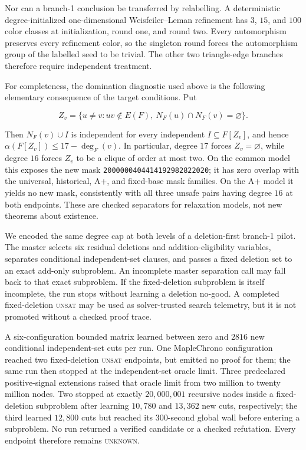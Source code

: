 Nor can a branch-1 conclusion be transferred by relabelling.  A deterministic
degree-initialized one-dimensional Weisfeiler--Leman refinement has \(3\),
\(15\), and \(100\) color classes at initialization, round one, and round two.
Every automorphism preserves every refinement color, so the singleton round
forces the automorphism group of the labelled seed to be trivial.  The other
two triangle-edge branches therefore require independent treatment.

For completeness, the domination diagnostic used above is the following
elementary consequence of the target conditions.  Put

\[
 Z_v=\{u\ne v:uv\notin E(F),\ N_F(u)\cap N_F(v)=\varnothing\}.
\]

Then \(N_F(v)\cup I\) is independent for every independent
\(I\subseteq F[Z_v]\), and hence
\(\alpha(F[Z_v])\le17-\deg_F(v)\).  In particular, degree \(17\) forces
\(Z_v=\varnothing\), while degree \(16\) forces \(Z_v\) to be a clique of
order at most two.  On the common model this exposes the new mask
\texttt{2000000404414192982822020}; it has zero overlap with the universal,
historical, A+, and fixed-base mask families.  On the A+ model it yields no
new mask, consistently with all three unsafe pairs having degree \(16\) at
both endpoints.  These are checked separators for relaxation models, not
new theorems about existence.

We encoded the same degree cap at both levels of a deletion-first branch-1
pilot.  The master selects six residual deletions and addition-eligibility
variables, separates conditional independent-set clauses, and passes a fixed
deletion set to an exact add-only subproblem.  An incomplete master separation
call may fall back to that exact subproblem.  If the fixed-deletion subproblem
is itself incomplete, the run stops without learning a deletion no-good.  A
completed fixed-deletion \textsc{unsat} may be used as solver-trusted search
telemetry, but it is not promoted without a checked proof trace.

\begin{observation}
A six-configuration bounded matrix learned between zero and \(2816\) new
conditional independent-set cuts per run.  One MapleChrono configuration
reached two fixed-deletion \textsc{unsat} endpoints, but emitted no proof for
them; the same run then stopped at the independent-set oracle limit.  Three
predeclared positive-signal extensions raised that oracle limit from two
million to twenty million nodes.  Two stopped at exactly \(20{,}000{,}001\)
recursive nodes inside a fixed-deletion subproblem after learning \(10{,}780\)
and \(13{,}362\) new cuts, respectively; the third learned \(12{,}800\) cuts
but reached its \(300\)-second global wall before entering a subproblem.  No
run returned a verified candidate or a checked refutation.  Every endpoint
therefore remains \textsc{unknown}.
\end{observation}

